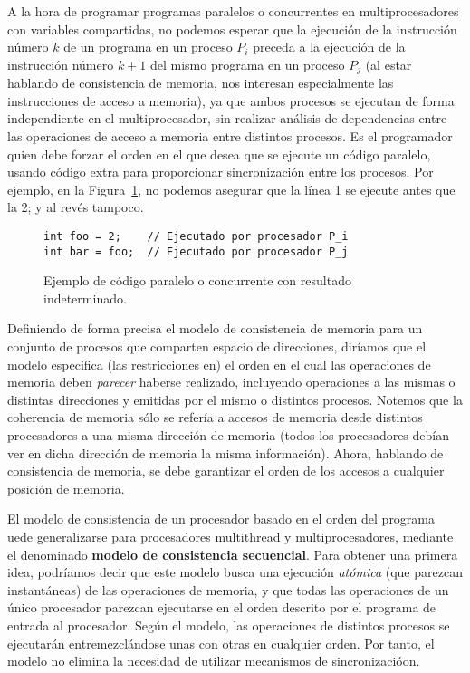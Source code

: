 A la hora de programar programas paralelos o concurrentes en multiprocesadores con variables compartidas, no podemos esperar que la ejecución de la instrucción número $k$ de un programa en un proceso $P_i$ preceda a la ejecución de la instrucción número $k+1$ del mismo programa en un proceso $P_j$ (al estar hablando de consistencia de memoria, nos interesan especialmente las instrucciones de acceso a memoria), ya que ambos procesos se ejecutan de forma independiente en el multiprocesador, sin realizar análisis de dependencias entre las operaciones de acceso a memoria entre distintos procesos. Es el programador quien debe forzar el orden en el que desea que se ejecute un código paralelo, usando código extra para proporcionar sincronización entre los procesos. Por ejemplo, en la Figura~\ref{codigo:instrucciones_seguidas_paralelo}, no podemos asegurar que la línea 1 se ejecute antes que la 2; y al revés tampoco.

\begin{figure}[H]
\centering
\begin{verbatim}
int foo = 2;    // Ejecutado por procesador P_i
int bar = foo;  // Ejecutado por procesador P_j
\end{verbatim}
\caption{Ejemplo de código paralelo o concurrente con resultado indeterminado.}    
\label{codigo:instrucciones_seguidas_paralelo}
\end{figure}

Definiendo de forma precisa el modelo de consistencia de memoria para un conjunto de procesos que comparten espacio de direcciones, diríamos que el modelo especifica (las restricciones en) el orden en el cual las operaciones de memoria deben \emph{parecer} haberse realizado, incluyendo operaciones a las mismas o distintas direcciones y emitidas por el mismo o distintos procesos. Notemos que la coherencia de memoria sólo se refería a accesos de memoria desde distintos procesadores a una misma dirección de memoria (todos los procesadores debían ver en dicha dirección de memoria la misma información). Ahora, hablando de consistencia de memoria, se debe garantizar el orden de los accesos a cualquier posición de memoria.

El modelo de consistencia de un procesador basado en el orden del programa uede generalizarse para procesadores multithread y multiprocesadores, mediante el denominado \textbf{modelo de consistencia secuencial}. Para obtener una primera idea, podríamos decir que este modelo busca una ejecución \emph{atómica} (que parezcan instantáneas) de las operaciones de memoria, y que todas las operaciones de un único procesador parezcan ejecutarse en el orden descrito por el programa de entrada al procesador. Según el modelo, las operaciones de distintos procesos se ejecutarán entremezclándose unas con otras en cualquier orden. Por tanto, el modelo no elimina la necesidad de utilizar mecanismos de sincronizacióon.

